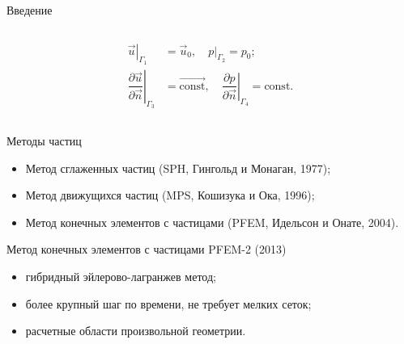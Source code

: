 \documentclass[9pt, ignoreonframetext,unicode]{beamer}
\begin{document}
\begin{frame}{Введение}
\begin{columns}
\begin{column}{0.45\textwidth}
\begin{align*}
	\left.\vec{u}\right|_{\Gamma_1}&=\vec{u}_0,\quad  \left. p\right|_{\Gamma_2}=p_0;\\
	\left.\dfrac{\partial\vec{u}}{\partial \vec{n}}\right|_{\Gamma_3}&=\overrightarrow{\text{const}},\quad
	\left.\dfrac{\partial p}{\partial \vec{n}}\right|_{\Gamma_4}=\text{const}.
\end{align*}
		\end{column}
		\end{columns}
	\medskip
\begin{block}{Методы частиц}
	\begin{itemize}
		\item Метод сглаженных частиц (SPH, Гингольд и Монаган, 1977);
		\item Метод движущихся частиц (MPS, Кошизука и Ока, 1996);
		\item Метод конечных элементов с частицами (PFEM, Идельсон и Онате, 2004).
	\end{itemize}
\end{block}
\begin{block}{Метод конечных элементов с частицами PFEM-2 (2013)}
\begin{itemize}
\item гибридный эйлерово-лагранжев метод;
\item более крупный шаг по времени, не требует мелких сеток;
\item расчетные области произвольной геометрии.
\end{itemize}
\end{block}

\end{frame}
\end{document}
